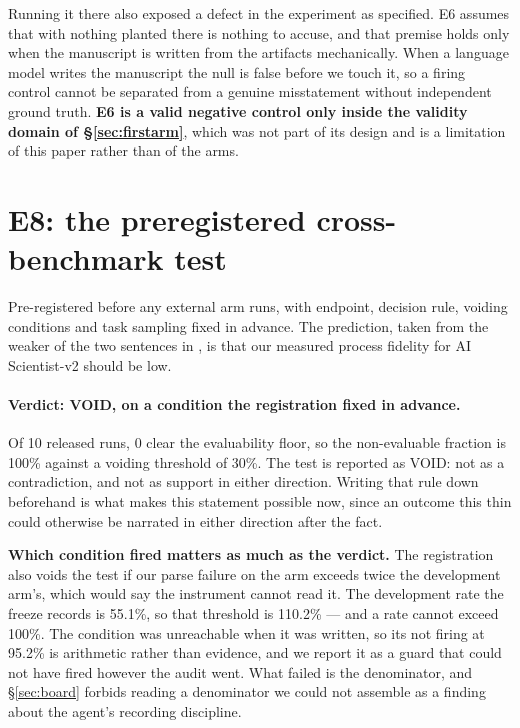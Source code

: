 \documentclass[10pt]{article}
\newcommand{\RM}[1]{{#1}}
\begin{document}
Running it there also exposed a defect in the experiment as specified. E6
assumes that with nothing planted there is nothing to accuse, and that premise
holds only when the manuscript is written from the artifacts mechanically. When
a language model writes the manuscript the null is false before we touch it, so
a firing control cannot be separated from a genuine misstatement without
independent ground truth. \textbf{E6 is a valid negative control only inside
the validity domain of \S\ref{sec:firstarm}}, which was not part of its design
and is a limitation of this paper rather than of the arms.



\section{E8: the preregistered cross-benchmark test}
\label{app:e8}
\label{sec:e8}
Pre-registered before any external arm runs, with endpoint, decision rule,
voiding conditions and task sampling fixed in advance. The prediction, taken
from the weaker of the two sentences in \cite{mlrbench}, is that our measured
process fidelity for AI Scientist-v2 should be low.

\paragraph{Verdict: VOID, on a condition the registration fixed in advance.}
Of \RM{10} released runs, \RM{0} clear the evaluability floor, so the
non-evaluable fraction is \RM{100\%} against a voiding threshold of \RM{30\%}.
The test is reported as VOID: not as a contradiction, and not as support in
either direction. Writing that rule down beforehand is what makes this
statement possible now, since an outcome this thin could otherwise be narrated
in either direction after the fact.

\textbf{Which condition fired matters as much as the verdict.} The registration
also voids the test if our parse failure on the arm exceeds twice the
development arm's, which would say the instrument cannot read it. The
development rate the freeze records is \RM{55.1\%}, so that threshold is
\RM{110.2\%} --- and a rate cannot exceed \RM{100\%}. The condition was
unreachable when it was written, so its not firing at \RM{95.2\%} is
arithmetic rather than evidence, and we report it as a guard that could not have
fired however the audit went. What failed is the denominator, and
\S\ref{sec:board} forbids reading a denominator we could not assemble as a
finding about the agent's recording discipline.
\end{document}

